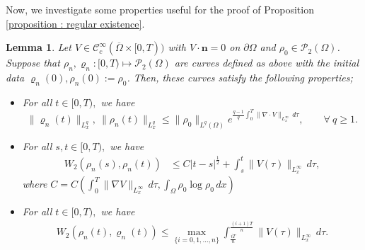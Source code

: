 \documentclass{amsart}
\newtheorem{lemma}[defn]{Lemma}
\numberwithin{equation}{section}
\begin{document}
 Now, we investigate some properties useful for the proof of Proposition \ref{proposition : regular existence}.
\begin{lemma}\label{Lemma:AC-curve}\cite[Lemma 5.4]{HKK01}
Let $V \in \mathcal{C}_c^\infty (\overline{\Omega} \times [0, T))$ with
$V\cdot\mathbf{n}=0$ on $\partial \Omega$  and $\rho_0 \in \mathcal{P}_{2}(\Omega)$. 
Suppose that $\rho_n,\varrho_n:[0,T)\mapsto
\mathcal{P}_{2}(\Omega)$ are curves defined as above with the initial
data $\varrho_n(0),\rho_n(0):=\rho_0 $. Then, these curves satisfy
the following properties;
\begin{itemize}
\item[(i)] For all $t\in [0,T),$ we have
\begin{equation}\label{eq29:Lemma:AC-curve}
\|\varrho_{n}(t)\|_{L^q_x}, \  \|\rho_{n}(t)\|_{L^q_x} \leq
\|\rho_0\|_{L^q(\Omega)} e^{\frac{q-1}{q}\int_0^T \|\nabla \cdot
V\|_{L^\infty_x} \,d\tau}, \qquad \forall ~  q \geq 1.
\end{equation}

\item[(ii)] For all $s,t \in [0,T),$ we have
\begin{equation*}\label{eq20:Lemma:AC-curve}
\begin{aligned}
W_{2}(\rho_{n}(s), \rho_{n}(t)) &\leq C |t-s|^{\frac{1}{2}}+ \int_s^t
\|V(\tau)\|_{L^\infty_x} \,d\tau  ,
\end{aligned}
\end{equation*}
where $C= C(\int_0^T \|\nabla V\|_{L^\infty_x}  \,d\tau , \int_\Omega \rho_0 \log \rho_0 \, dx)$

\item[(iii)] For all $t \in [0,T),$ we have
\begin{equation*}\label{eq21:Lemma:AC-curve}
\begin{aligned}
W_{2}(\rho_{n}(t), {\varrho}_{n}(t)) \leq
\max_{\{i=0,1,\dots,n\}}\int_{\frac{iT}{n}}^{\frac{(i+1)T}{n}}
\|V(\tau)\|_{L^\infty_x} \,d\tau.
\end{aligned}
\end{equation*}

\end{itemize}
\end{lemma}
\end{document}
